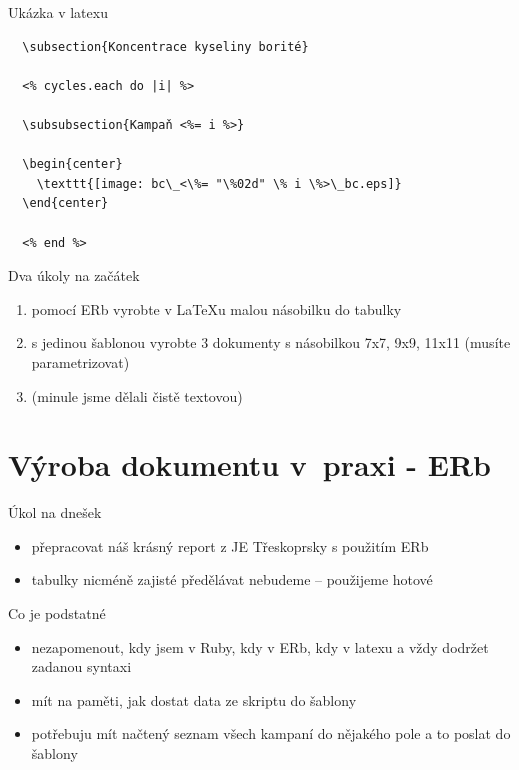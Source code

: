 \documentclass{beamer}
\begin{document}
\begin{frame}[fragile]{Ukázka v latexu}
\scriptsize
\begin{verbatim}
  \subsection{Koncentrace kyseliny borité}

  <% cycles.each do |i| %>

  \subsubsection{Kampaň <%= i %>}

  \begin{center}
    \texttt{[image: bc\_<\%= "\%02d" \% i \%>\_bc.eps]}
  \end{center}

  <% end %>
\end{verbatim}
\end{frame}

\begin{frame}{Dva úkoly na začátek}
  \begin{enumerate}
    \item pomocí ERb vyrobte v LaTeXu malou násobilku do tabulky
    \item s jedinou šablonou vyrobte 3 dokumenty s násobilkou 7x7, 9x9, 11x11 (musíte parametrizovat)
    \item (minule jsme dělali čistě textovou)
  \end{enumerate}
\end{frame}

\section{Výroba dokumentu v~praxi - ERb}

\begin{frame}{Úkol na dnešek}
  \begin{itemize}
    \item přepracovat náš krásný report z JE Třeskoprsky s použitím ERb
    \item tabulky nicméně zajisté předělávat nebudeme -- použijeme hotové
  \end{itemize}
\end{frame}

\begin{frame}{Co je podstatné}
  \begin{itemize}
    \item nezapomenout, kdy jsem v Ruby, kdy v ERb, kdy v latexu a vždy dodržet zadanou syntaxi
    \item mít na paměti, jak dostat data ze skriptu do šablony
    \item potřebuju mít načtený seznam všech kampaní do nějakého pole a to poslat do šablony
  \end{itemize}
\end{frame}
\end{document}
